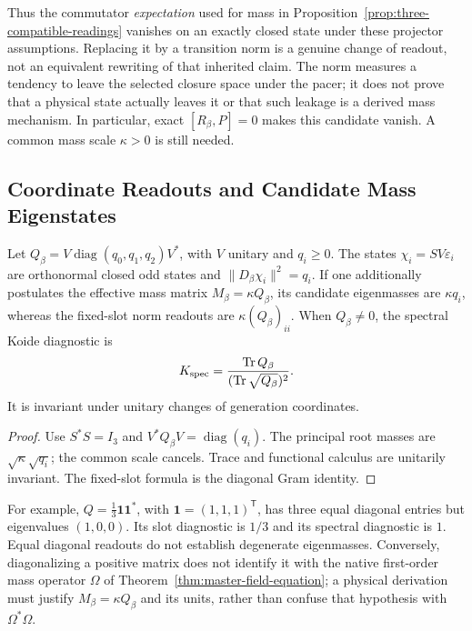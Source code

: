 Thus the commutator \emph{expectation} used for mass in
Proposition~\ref{prop:three-compatible-readings} vanishes on an
exactly closed state under these projector assumptions. Replacing it
by a transition norm is a genuine change of readout, not an equivalent
rewriting of that inherited claim. The norm measures a tendency to
leave the selected closure space under the pacer; it does not prove
that a physical state actually leaves it or that such leakage is a
derived mass mechanism. In particular, exact $[R_\beta,P]=0$ makes
this candidate vanish. A common mass scale $\kappa>0$ is still needed.

\subsection{Coordinate Readouts and Candidate Mass Eigenstates}
\label{v480:generation-spectrum}

\begin{proposition}
\label{v480:generation-mass-spectrum}
Let $Q_\beta=V\operatorname{diag}(q_0,q_1,q_2)V^*$,
with $V$ unitary and $q_i\geq0$. The states
$\chi_i=SV\varepsilon_i$ are orthonormal closed odd states and
$\|D_\beta\chi_i\|^2=q_i$. If one additionally postulates the
effective mass matrix $M_\beta=\kappa Q_\beta$, its candidate
eigenmasses are $\kappa q_i$, whereas the fixed-slot norm readouts
are $\kappa(Q_\beta)_{ii}$. When $Q_\beta\ne0$, the spectral
Koide diagnostic is
\[
 K_{\rm spec}
 =\frac{\operatorname{Tr}Q_\beta}
        {(\operatorname{Tr}\sqrt{Q_\beta})^2}.
\]
It is invariant under unitary changes of generation coordinates.
\end{proposition}
\begin{proof}
Use $S^*S=I_3$ and $V^*Q_\beta V=\operatorname{diag}(q_i)$.
The principal root masses are $\sqrt\kappa\sqrt{q_i}$; the
common scale cancels. Trace and functional calculus are unitarily
invariant. The fixed-slot formula is the diagonal Gram identity.
\end{proof}

For example, $Q=\tfrac13\mathbf1\mathbf1^*$, with
$\mathbf1=(1,1,1)^{\mathsf T}$, has three equal diagonal entries
but eigenvalues $(1,0,0)$. Its slot diagnostic is $1/3$ and its
spectral diagnostic is $1$. Equal diagonal readouts do not establish
degenerate eigenmasses. Conversely, diagonalizing a positive matrix
does not identify it with the native first-order mass operator
$\Omega$ of Theorem~\ref{thm:master-field-equation}; a physical
derivation must justify $M_\beta=\kappa Q_\beta$ and its units,
rather than confuse that hypothesis with $\Omega^*\Omega$.

